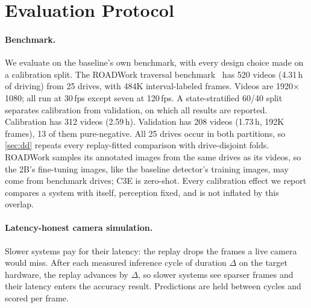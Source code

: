 \documentclass[conference]{IEEEtran}
\begin{document}
\section{Evaluation Protocol}
\label{sec:protocol}

\paragraph{Benchmark.} We evaluate on the baseline's own benchmark, with every design choice made on a calibration split.  The ROADWork traversal benchmark~\cite{priorsystem2026} has 520 videos (4.31\,h of driving) from 25 drives, with 484K interval-labeled frames.  Videos are 1920$\times$1080; all run at 30\,fps except seven at 120\,fps.  A state-stratified 60/40 split separates calibration from validation, on which all results are reported.  Calibration has 312 videos (2.59\,h).  Validation has 208 videos (1.73\,h, 192K frames), 13 of them pure-negative.  All 25 drives occur in both partitions, so \cref{sec:dd} repeats every replay-fitted comparison with drive-disjoint folds.  ROADWork samples its annotated images from the same drives as its videos, so the 2B's fine-tuning images, like the baseline detector's training images, may come from benchmark drives; C3E is zero-shot.  Every calibration effect we report compares a system with itself, perception fixed, and is not inflated by this overlap.

\paragraph{Latency-honest camera simulation.} Slower systems pay for their latency: the replay drops the frames a live camera would miss.  After each measured inference cycle of duration $\Delta$ on the target hardware, the replay advances by $\Delta$, so slower systems see sparser frames and their latency enters the accuracy result.  Predictions are held between cycles and scored per frame.
\end{document}
